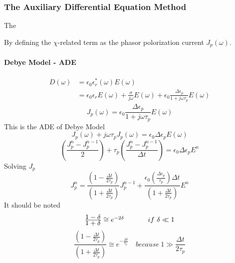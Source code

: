 \subsubsection{The Auxiliary Differential Equation Method}
The 

By defining the $\chi$-related term as the phasor polorization current $J_p(\omega)$.
\paragraph{{\msjh Debye Model - ADE}}
\begin{equation}
  \begin{split}
    D(\omega) & = \epsilon_0\epsilon_r^*(\omega)E(\omega)\\
    & =  \epsilon_0 \epsilon_rE(\omega) + \frac{\sigma}{j\omega} E(\omega) + \epsilon_0 \frac{\Delta \epsilon_p}{1+j\omega \tau_p}E(\omega)\label{eq:debye_ade_start}
  \end{split}
\end{equation}
\begin{equation}
  J_p(\omega) = \epsilon_0 \frac{\Delta \epsilon_p}{1+j\omega \tau_p}E(\omega)
\end{equation}
This is the ADE of Debye Model
\begin{equation}
  J_p(\omega) + j\omega\tau_{p}J_p(\omega) = \epsilon_0\Delta\epsilon_p E(\omega)
\end{equation}
\begin{equation}
  \left( \frac{J_p^n - J_p^{n-1}}{2} \right) + \tau_p \left( \frac{J_p^n - J_p^{n-1}}{\Delta t}\right) = \epsilon_0\Delta\epsilon_p E^n
\end{equation}
Solving $J_p$
\begin{equation}
  J_p^n = \frac{\left(1-\frac{\Delta t}{2\tau_p}\right)}{\left(1+\frac{\Delta t}{2\tau_p}\right)}J_p^{n-1} 
  + \frac{\epsilon_0\left(\frac{\Delta\epsilon_p}{\tau_p}\right)\Delta t}{\left(1+\frac{\Delta t}{2\tau_p}\right)} E^n
\end{equation}
It should be noted
\begin{equation}
  \begin{array}{@{}lp{0.5cm}r@{}}
    \frac{\displaystyle1-\delta}{\displaystyle1+\delta} \cong e^{-2\delta} && if\ \delta \ll 1
  \end{array}
\end{equation}
\begin{equation}
  \frac{\left(1-\frac{\displaystyle\Delta t}{\displaystyle2\tau_p}\right)}{\left(1+\frac{\displaystyle\Delta t}{\displaystyle2\tau_p}\right)} \cong e^{-\frac{\Delta t}{\tau_p}}\quad  because\ 1 \gg \frac{\Delta t}{2\tau_p}
\end{equation}
